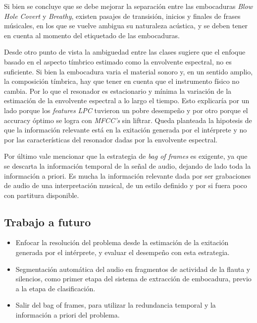 \documentclass{article}
\begin{document}
Si bien se concluye que se debe mejorar la separación entre las embocaduras \textit{Blow Hole Covert} y \textit{Breathy}, existen pasajes de transisión, inicios y finales de frases músicales, en los que se vuelve ambigua su naturaleza acústica, y se deben tener en cuenta al momento del etiquetado de las embocaduras. 

\medskip

Desde otro punto de vista la ambiguedad entre las clases sugiere que el enfoque basado en el aspecto tímbrico estimado como la envolvente espectral, no es suficiente. Si bien la embocadura varia el material sonoro y, en un sentido amplio, la composición tímbrica, hay que tener en cuenta que el instrumento físico no cambia. Por lo que el resonador es estacionario y mínima la variación de la estimación de la envolvente espectral a lo largo el tiempo. Esto explicaría por un lado porque los \textit{features} \textit{LPC} tuvieron un pobre desempeño y por otro porque el accuracy óptimo se logra con \textit{MFCC's} sin liftrar. Queda planteada la hipotesis de que la información relevante está en la exitación generada por el intérprete y no por las características del resonador dadas por la envolvente espectral.

\medskip

Por último vale mencionar que la estrategia de \textit{bag of frames} es exigente, ya que se descarta la información temporal de la señal de audio, dejando de lado toda la información a priori. Es mucha la información relevante dada por ser grabaciones de audio de una interpretación musical, de un estilo definido y por si fuera poco con partitura disponible. 


\subsection{Trabajo a futuro}

\begin{itemize} 

  \item Enfocar la resolución del problema desde la estimación de la exitación generada por el intérprete, y evaluar el desempeño con esta estrategia.
  
  \item Segmentación automática del audio en fragmentos de actividad de la flauta y silencios, como primer etapa del sistema de extracción de embocadura, previo a la etapa de clasificación.
   
  \item Salir del bag of frames, para utilizar la redundancia temporal y la información a priori del problema.

\end{itemize}


\newpage




\end{document}
